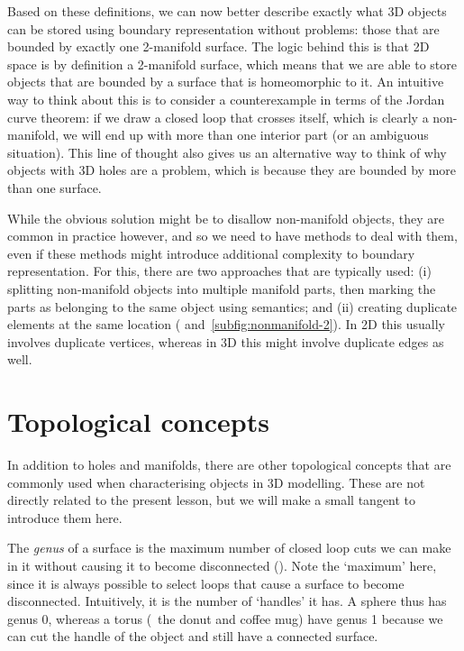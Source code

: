 Based on these definitions, we can now better describe exactly what 3D objects can be stored using boundary representation without problems: those that are bounded by exactly one 2-manifold surface.
The logic behind this is that 2D space is by definition a 2-manifold surface, which means that we are able to store objects that are bounded by a surface that is homeomorphic to it.
An intuitive way to think about this is to consider a counterexample in terms of the Jordan curve theorem: if we draw a closed loop that crosses itself, which is clearly a non-manifold, we will end up with more than one interior part (or an ambiguous situation).
This line of thought also gives us an alternative way to think of why objects with 3D holes are a problem, which is because they are bounded by more than one surface.

While the obvious solution might be to disallow non-manifold objects, they are common in practice however, and so we need to have methods to deal with them, even if these methods might introduce additional complexity to boundary representation.
For this, there are two approaches that are typically used: (i) splitting non-manifold objects into multiple manifold parts, then marking the parts as belonging to the same object using semantics; and (ii) creating duplicate elements at the same location ( and~\ref{subfig:nonmanifold-2}).
In 2D this usually involves duplicate vertices, whereas in 3D this might involve duplicate edges as well.

\section{Topological concepts}

In addition to holes and manifolds, there are other topological concepts that are commonly used when characterising objects in 3D modelling.
These are not directly related to the present lesson, but we will make a small tangent to introduce them here.

The \emph{genus} of a surface is the maximum number of closed loop cuts we can make in it without causing it to become disconnected ().
Note the `maximum' here, since it is always possible to select loops that cause a surface to become disconnected.
Intuitively, it is the number of `handles' it has.
A sphere thus has genus 0, whereas a torus (\eg\ the donut and coffee mug) have genus 1 because we can cut the handle of the object and still have a connected surface.

